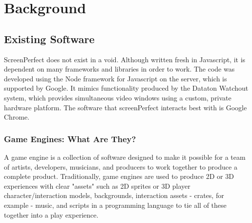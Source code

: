
\chapter{Background} %

\label{Chapter2} %




\section{Existing Software}
ScreenPerfect does not exist in a void. Although written fresh in Javascript, it is dependent on many frameworks and libraries in order to work. The code was developed using the Node framework for Javascript on the server, which is supported by Google. It mimics functionality produced by the Dataton Watchout system, which provides simultaneous video windows using a custom, private hardware platform. The software that screenPerfect interacts best with is Google Chrome.

\subsection{Game Engines: What Are They?}

A game engine is a collection of software designed to make it possible for a team of artists, developers, musicians, and producers to work together to produce a complete product. Traditionally, game engines are used to produce 2D or 3D experiences with clear "assets" such as 2D sprites or 3D player character/interaction models, backgrounds, interaction assets - crates, for example - music, and scripts in a programming language to tie all of these together into a play experience.

